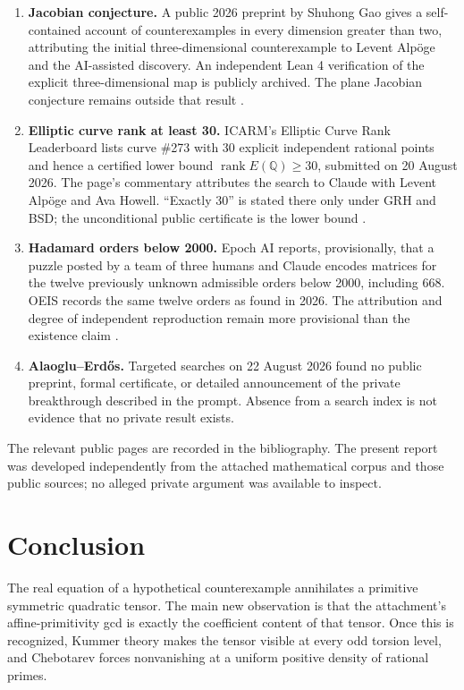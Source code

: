 \documentclass[11pt]{article}
\numberwithin{equation}{section}
\theoremstyle{definition}
\theoremstyle{remark}
\newcommand{\Q}{\mathbb Q}
\newcommand{\rank}{\operatorname{rank}}
\begin{document}
\begin{enumerate}
\item \textbf{Jacobian conjecture.}  A public 2026 preprint by Shuhong Gao gives a
self-contained account of counterexamples in every dimension greater than two, attributing
the initial three-dimensional counterexample to Levent Alp\"oge and the AI-assisted discovery.
An independent Lean 4 verification of the explicit three-dimensional map is publicly archived.
The plane Jacobian conjecture remains outside that result \cite{Gao2026,LeanJacobian}.
\item \textbf{Elliptic curve rank at least 30.}  ICARM's Elliptic Curve Rank Leaderboard lists
curve \#273 with 30 explicit independent rational points and hence a certified lower bound
\(\rank E(\Q)\ge30\), submitted on 20 August 2026.  The page's commentary attributes the
search to Claude with Levent Alp\"oge and Ava Howell.  ``Exactly 30'' is stated there only
under GRH and BSD; the unconditional public certificate is the lower bound \cite{ICARM30}.
\item \textbf{Hadamard orders below 2000.}  Epoch AI reports, provisionally, that a puzzle
posted by a team of three humans and Claude encodes matrices for the twelve previously unknown
admissible orders below 2000, including 668.  OEIS records the same twelve orders as found in
2026.  The attribution and degree of independent reproduction remain more provisional than
the existence claim \cite{EpochHadamard,OEISHadamard}.
\item \textbf{Alaoglu--Erd\H{o}s.}  Targeted searches on 22 August 2026 found no public
preprint, formal certificate, or detailed announcement of the private breakthrough described
in the prompt.  Absence from a search index is not evidence that no private result exists.
\end{enumerate}

The relevant public pages are recorded in the bibliography.  The present report was developed
independently from the attached mathematical corpus and those public sources; no alleged
private argument was available to inspect.

\section{Conclusion}
\label{sec:conclusion}

The real equation of a hypothetical counterexample annihilates a primitive symmetric
quadratic tensor.  The main new observation is that the attachment's affine-primitivity gcd is
exactly the coefficient content of that tensor.  Once this is recognized, Kummer theory makes
the tensor visible at every odd torsion level, and Chebotarev forces nonvanishing at a uniform
positive density of rational primes.
\end{document}
